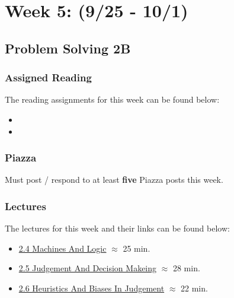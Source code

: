 \clearpage
\chapter{Week 5: (9/25 - 10/1)}

\section{Problem Solving 2B}

\subsection{Assigned Reading}

The reading assignments for this week can be found below:

\begin{itemize}
    \item {}
    \item {}
\end{itemize}

\subsection{Piazza}

Must post / respond to at least \textbf{five} Piazza posts this week.  

\subsection{Lectures}

The lectures for this week and their links can be found below:

\begin{itemize}
    \item \href{https://applied.cs.colorado.edu/mod/hvp/view.php?id=49359}{2.4 Machines And Logic} $\approx$ 25 min.
    \item \href{https://applied.cs.colorado.edu/mod/hvp/view.php?id=49360}{2.5 Judgement And Decision Makeing} $\approx$ 28 min.
    \item \href{https://applied.cs.colorado.edu/mod/hvp/view.php?id=49361}{2.6 Heuristics And Biases In Judgement} $\approx$ 22 min.
\end{itemize}

